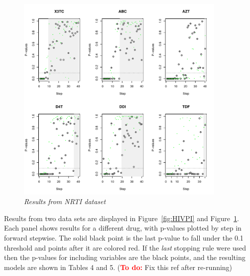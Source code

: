 \documentclass{imsart}
\newcommand{\todo}{\textcolor{red}{\textbf{To do: }}}
\begin{document}
\begin{figure}
\begin{center}
\includegraphics[width=0.9\textwidth]{../figs/HIV_NRTI.pdf}
\caption{\small \it Results from NRTI dataset}
\label{fig:HIVNRTI}
\end{center}
\end{figure}

Results from two data sets are displayed in Figure~\ref{fig:HIVPI} and
Figure~\ref{fig:HIVNRTI}. Each panel shows results for a different drug,
with p-values plotted by step in forward stepwise. The solid black point
is the last p-value to fall under the 0.1 threshold and points after it
are colored red. If the \textit{last} stopping rule were used then the
p-values for including variables are the black points, and the resulting
models are shown in Tables 4 and 5. (\todo Fix this ref after re-running)




\end{document}
